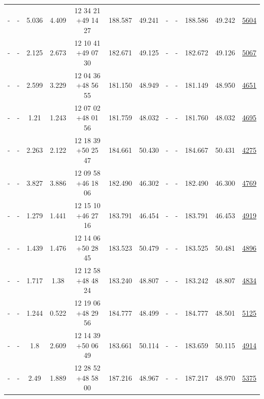 \documentclass{article}
\begin{document}
\begin{landscape}
\begin{longtable}{c|c|c|c|c|c|c|c|c|c|c|c}
- & - & 5.036 & 4.409 & 12 34 21 +49 14 27 &  188.587 & 49.241 &  - & - & 188.586 & 49.242 & \href{http://banana.transientskp.org/r4/vlo_KmeulenSimSource/runningcatalog/5604}{5604}  \\
- & - & 2.125 & 2.673 & 12 10 41 +49 07 30 &  182.671 & 49.125 &  - & - & 182.672 & 49.126 & \href{http://banana.transientskp.org/r4/vlo_KmeulenSimSource/runningcatalog/5067}{5067}  \\
- & - & 2.599 & 3.229 & 12 04 36 +48 56 55 &  181.150 & 48.949 &  - & - & 181.149 & 48.950 & \href{http://banana.transientskp.org/r4/vlo_KmeulenSimSource/runningcatalog/4651}{4651}  \\
- & - & 1.21 & 1.243 & 12 07 02 +48 01 56 &  181.759 & 48.032 &  - & - & 181.760 & 48.032 & \href{http://banana.transientskp.org/r4/vlo_KmeulenSimSource/runningcatalog/4695}{4695}  \\
- & - & 2.263 & 2.122 & 12 18 39 +50 25 47 &  184.661 & 50.430 &  - & - & 184.667 & 50.431 & \href{http://banana.transientskp.org/r4/vlo_KmeulenSimSource/runningcatalog/4275}{4275}  \\
- & - & 3.827 & 3.886 & 12 09 58 +46 18 06 &  182.490 & 46.302 &  - & - & 182.490 & 46.300 & \href{http://banana.transientskp.org/r4/vlo_KmeulenSimSource/runningcatalog/4769}{4769}  \\
- & - & 1.279 & 1.441 & 12 15 10 +46 27 16 &  183.791 & 46.454 &  - & - & 183.791 & 46.453 & \href{http://banana.transientskp.org/r4/vlo_KmeulenSimSource/runningcatalog/4919}{4919}  \\
- & - & 1.439 & 1.476 & 12 14 06 +50 28 45 &  183.523 & 50.479 &  - & - & 183.525 & 50.481 & \href{http://banana.transientskp.org/r4/vlo_KmeulenSimSource/runningcatalog/4896}{4896}  \\
- & - & 1.717 & 1.38 & 12 12 58 +48 48 24 &  183.240 & 48.807 &  - & - & 183.242 & 48.807 & \href{http://banana.transientskp.org/r4/vlo_KmeulenSimSource/runningcatalog/4834}{4834}  \\
- & - & 1.244 & 0.522 & 12 19 06 +48 29 56 &  184.777 & 48.499 &  - & - & 184.777 & 48.501 & \href{http://banana.transientskp.org/r4/vlo_KmeulenSimSource/runningcatalog/5125}{5125}  \\
- & - & 1.8 & 2.609 & 12 14 39 +50 06 49 &  183.661 & 50.114 &  - & - & 183.659 & 50.115 & \href{http://banana.transientskp.org/r4/vlo_KmeulenSimSource/runningcatalog/4914}{4914}  \\
- & - & 2.49 & 1.889 & 12 28 52 +48 58 00 &  187.216 & 48.967 &  - & - & 187.217 & 48.970 & \href{http://banana.transientskp.org/r4/vlo_KmeulenSimSource/runningcatalog/5375}{5375}  \\

\end{longtable}
\end{landscape}
\end{document}
